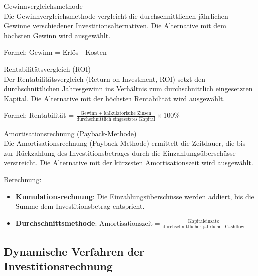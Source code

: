 \begin{definition}{Gewinnvergleichsmethode}\\
Die Gewinnvergleichsmethode vergleicht die durchschnittlichen jährlichen Gewinne verschiedener Investitionsalternativen. Die Alternative mit dem höchsten Gewinn wird ausgewählt.

Formel: Gewinn = Erlös - Kosten
\end{definition}

\begin{definition}{Rentabilitätsvergleich (ROI)}\\
Der Rentabilitätsvergleich (Return on Investment, ROI) setzt den durchschnittlichen Jahresgewinn ins Verhältnis zum durchschnittlich eingesetzten Kapital. Die Alternative mit der höchsten Rentabilität wird ausgewählt.

Formel: Rentabilität = $\frac{\text{Gewinn + kalkulatorische Zinsen}}{\text{durchschnittlich eingesetztes Kapital}} \times 100\%$
\end{definition}

\begin{definition}{Amortisationsrechnung (Payback-Methode)}\\
Die Amortisationsrechnung (Payback-Methode) ermittelt die Zeitdauer, die bis zur Rückzahlung des Investitionsbetrages durch die Einzahlungsüberschüsse verstreicht. Die Alternative mit der kürzesten Amortisationszeit wird ausgewählt.

Berechnung:
\begin{itemize}
    \item \textbf{Kumulationsrechnung}: Die Einzahlungsüberschüsse werden addiert, bis die Summe dem Investitionsbetrag entspricht.
    \item \textbf{Durchschnittsmethode}: $\text{Amortisationszeit} = \frac{\text{Kapitaleinsatz}}{\text{durchschnittlicher jährlicher Cashflow}}$
\end{itemize}
\end{definition}

\subsection{Dynamische Verfahren der Investitionsrechnung}

